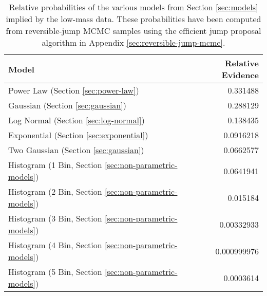 \documentclass[preprint]{aastex}
\begin{document}
\begin{table}
  \begin{center}
    \begin{tabular}{|l|r|}
      \hline
      Model & Relative Evidence \\
      \hline \hline
      Power Law (Section \ref{sec:power-law}) & 0.331488 \\
      \hline
      Gaussian (Section \ref{sec:gaussian}) & 0.288129 \\ 
      \hline
      Log Normal (Section \ref{sec:log-normal}) & 0.138435 \\
      \hline
      Exponential (Section \ref{sec:exponential}) & 0.0916218 \\
      \hline
      Two Gaussian (Section \ref{sec:gaussian}) & 0.0662577 \\
      \hline
      Histogram (1 Bin, Section \ref{sec:non-parametric-models}) &
      0.0641941 \\
      \hline
      Histogram (2 Bin, Section \ref{sec:non-parametric-models}) &
      0.015184 \\
      \hline 
      Histogram (3 Bin, Section \ref{sec:non-parametric-models}) &
      0.00332933 \\
      \hline
      Histogram (4 Bin, Section \ref{sec:non-parametric-models}) &
      0.000999976 \\
      \hline 
        Histogram (5 Bin, Section \ref{sec:non-parametric-models}) &
      0.0003614  \\
      \hline      
    \end{tabular}
  \end{center}
  \caption{\label{tab:rj} Relative probabilities of the various models
    from Section \ref{sec:models} implied by the low-mass data.  These probabilities have been 
    computed from reversible-jump
    MCMC samples using the efficient jump proposal algorithm in Appendix \ref{sec:reversible-jump-mcmc}.}
\end{table}
\end{document}
